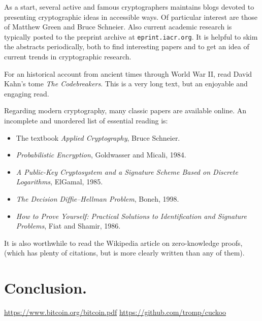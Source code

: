 \documentclass[letterpaper]{article}
\begin{document}
As a start, several active and famous cryptographers maintains blogs devoted
to presenting cryptographic ideas in accessible ways. Of particular interest
are those of Matthew Green and Bruce Schneier. Also current academic research
is typically posted to the preprint archive at \texttt{eprint.iacr.org}. It
is helpful to skim the abstracts periodically, both to find interesting papers
and to get an idea of current trends in cryptographic research.

For an historical account from ancient times through World War II, read
David Kahn's tome \emph{The Codebreakers}. This is a very long text, but an
enjoyable and engaging read.

Regarding modern cryptography, many classic papers are available online. An
incomplete and unordered list of essential reading is:
\begin{itemize}
\item The textbook \emph{Applied Cryptography}, Bruce Schneier.
\item \emph{Probabilistic Encryption}, Goldwasser and Micali, 1984.
\item \emph{A Public-Key Cryptosystem and a Signature Scheme Based on Discrete Logarithms}, ElGamal, 1985.
\item \emph{The Decision Diffie–Hellman Problem}, Boneh, 1998.
\item \emph{How to Prove Yourself: Practical Solutions to Identification and Signature Problems}, Fiat and Shamir, 1986.
\end{itemize}
It is also worthwhile to read the Wikipedia article on zero-knowledge proofs,
(which has plenty of citations, but is more clearly written than any of them).

\section{Conclusion.}

\begin{thebibliography}{9}
 \url{https://www.bitcoin.org/bitcoin.pdf}
 \url{https://github.com/tromp/cuckoo}
\end{thebibliography}
\end{document}
